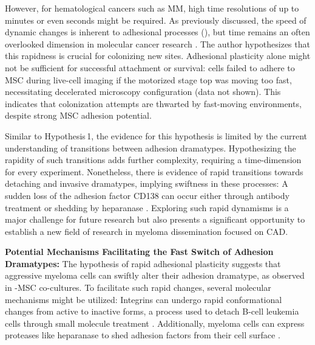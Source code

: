 However, for hematological cancers such as MM, high time resolutions of up to
minutes or even seconds might be required. As previously discussed, the speed of
dynamic changes is inherent to adhesional processes
(), but time remains an often
overlooked dimension in molecular cancer research%
\cite{uthamacumaranReviewMathematicalComputational2022}. The author hypothesizes
that this rapidness is crucial for colonizing new sites. Adhesional plasticity
alone might not be sufficient for successful attachment or survival: \INA cells
failed to adhere to \ac{MSC} during live-cell imaging if the motorized stage top
was moving too fast, necessitating decelerated microscopy configuration (data
not shown). This indicates that colonization attempts are thwarted by
fast-moving environments, despite strong \ac{MSC} adhesion potential.

Similar to Hypothesis\,1, the evidence for this hypothesis is limited by the
current understanding of transitions between adhesion dramatypes. Hypothesizing
the rapidity of such transitions adds further complexity, requiring a
time-dimension for every experiment. Nonetheless, there is evidence of rapid
transitions towards detaching and invasive dramatypes, implying swiftness in
these processes: A sudden loss of the adhesion factor CD138 can
occur either through antibody treatment or shedding by heparanase
\cite{yangHeparanasePromotesSpontaneous2005,
      akhmetzyanovaDynamicCD138Surface2020}. Exploring such rapid dynamisms is a major
challenge for future research but also presents a significant opportunity to
establish a new field of research in myeloma dissemination focused on \ac{CAD}.


\textbf{Potential Mechanisms Facilitating the Fast Switch of Adhesion Dramatypes:}
The hypothesis of rapid adhesional plasticity suggests that aggressive myeloma
cells can swiftly alter their adhesion dramatype, as observed in \INA-\ac{MSC}
co-cultures. To facilitate such rapid changes, several molecular mechanisms
might be utilized: Integrins can undergo rapid conformational changes from
active to inactive forms, a process used to detach B-cell leukemia cells through
small molecule treatment \cite{ruanVitroVivoEffects2022}. Additionally, myeloma
cells can express proteases like heparanase to shed adhesion factors from their
cell surface \cite{yangHeparanasePromotesSpontaneous2005}.


